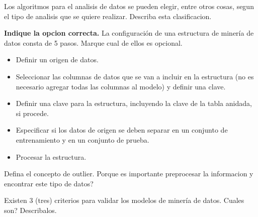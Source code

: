 \documentclass[11pt]{exam}
\begin{document}
\begin{questions}
\newpage
\addpoints
\question[2] Los algoritmos para el analisis de datos se pueden elegir, entre otros cosas, segun el tipo de analisis que se quiere realizar. Describa esta clasificacion.
\vspace{3in}

\addpoints
\question[1] \textbf{Indique la opcion correcta.} La configuración de una estructura de minería de datos consta de 5 pasos. Marque cual de ellos es opcional.

\begin{itemize}
\item Definir un origen de datos.
\item Seleccionar las columnas de datos que se van a incluir en la estructura (no es necesario agregar todas las columnas al modelo) y definir una clave.
\item Definir una clave para la estructura, incluyendo la clave de la tabla anidada, si procede.
\item Especificar si los datos de origen se deben separar en un conjunto de entrenamiento y en un conjunto de prueba.
\item Procesar la estructura.
\end{itemize}

\addpoints
\question[1] Defina el concepto de outlier. Porque es importante preprocesar la informacion y encontrar este tipo de datos?
\vspace{1in}

\addpoints
\question[1] Existen 3 (tres) criterios para validar los modelos de minería de datos. Cuales son? Describalos.
\vspace{4.5in}
\end{questions}
\end{document}
